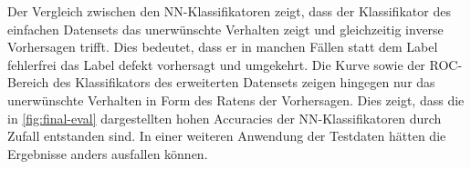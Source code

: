 Der Vergleich zwischen den NN-Klassifikatoren zeigt, dass der Klassifikator des einfachen Datensets das unerwünschte Verhalten zeigt und gleichzeitig inverse Vorhersagen trifft. Dies bedeutet, dass er in manchen Fällen statt dem Label \glqq fehlerfrei\grqq{} das Label \glqq defekt\grqq{} vorhersagt und umgekehrt. Die Kurve sowie der ROC-Bereich des Klassifikators des erweiterten Datensets zeigen hingegen nur das unerwünschte Verhalten in Form des \glqq Ratens\grqq{} der Vorhersagen. Dies zeigt, dass die in \autoref{fig:final-eval} dargestellten hohen Accuracies der NN-Klassifikatoren durch Zufall entstanden sind. In einer weiteren Anwendung der Testdaten hätten die Ergebnisse anders ausfallen können.

\begin{figure}[ht]
  \centering
  \qquad

\end{figure}
